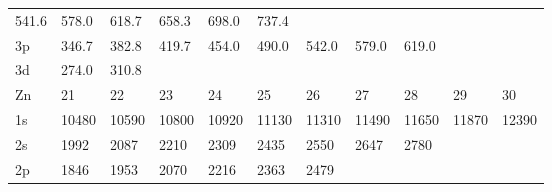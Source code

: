 \begin{table}
\begin{tabular}{lllllllllll}
541.6& 578.0& 618.7& 658.3& 698.0& 737.4\\
3p& 346.7& 382.8& 419.7& 454.0& 490.0& 542.0&
579.0& 619.0\\
3d& 274.0& 310.8\\
\hline
Zn& 21& 22&  23&  24&  25&  26&  27&  28&  29&  30\\
\hline
1s& 10480&
10590& 10800& 10920& 11130& 11310& 11490& 11650& 11870& 12390\\
2s&  1992&  2087&  2210&
2309&  2435&  2550&  2647&  2780\\
2p&  1846&  1953&  2070&  2216&  2363&
2479\\
\hline
\end{tabular}
\end{table}



